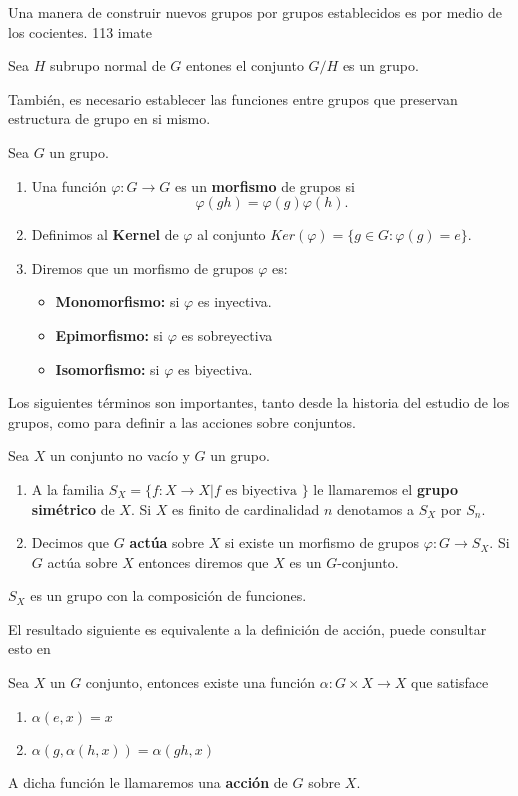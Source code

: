 	Una manera de construir nuevos grupos por grupos establecidos es por medio de los cocientes. 	113 imate
	
	\begin{te}
	Sea $H$ subrupo normal de  $G$ entones el conjunto $G/H$ es un grupo.
	\end{te}
	
	También, es necesario establecer las funciones entre grupos que preservan estructura de grupo en si mismo.
	
	\begin{df}
	Sea $G$ un grupo. 
	\begin{enumerate}
	\item Una función $\varphi:G \to G$ es un \textbf{morfismo} de grupos si $$\varphi(gh)=\varphi(g) \varphi(h).$$
	\item Definimos al \textbf{Kernel} de $\varphi$ al conjunto $Ker(\varphi)=\{ g \in G: \varphi(g)=e\}$.
	\item Diremos que un morfismo de grupos $\varphi$ es:
	\begin{itemize}
	\item \textbf{Monomorfismo:} si $\varphi$ es inyectiva.
	\item \textbf{Epimorfismo:} si $\varphi$ es sobreyectiva
	\item \textbf{Isomorfismo:} si $\varphi$ es biyectiva.
	\end{itemize}
	\end{enumerate}			
	\end{df}
	
	Los siguientes términos son importantes, tanto desde la historia del estudio de los grupos, como para definir a las acciones sobre conjuntos.	
	
	\begin{df}
	Sea $X$ un conjunto no vacío y $G$ un grupo.
	\begin{enumerate}
	\item A la familia $S_X=\{f:X \to X| f \text{ es biyectiva } \}$ le llamaremos el \textbf{grupo simétrico} de $X$. Si $X$ es finito de cardinalidad $n$ denotamos a $S_X$ por $S_n$.
	\item Decimos que $G$ \textbf{actúa} sobre $X$ si existe un morfismo de grupos $\varphi:G \to S_X$.  Si $G$ actúa sobre $X$ entonces diremos que $X$ es un $G$-conjunto.
	\end{enumerate}
	
	\end{df}
	
	\begin{nt}
	$S_X$ es un grupo con la composición de funciones. 
	\end{nt}	
	El resultado siguiente es equivalente a la definición de acción, puede consultar esto en 
	\begin{te}
	Sea $X$ un $G$ conjunto, entonces existe una función $\alpha:G \times X \to X$ que satisface
	\begin{enumerate}
	\item $\alpha(e,x)=x$
	\item $\alpha(g,\alpha(h,x))=\alpha(gh,x)$
	\end{enumerate}
	A dicha función le llamaremos una \textbf{acción} de $G$ sobre $X$.
	\end{te}
	

